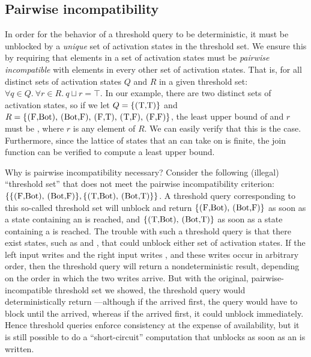 \subsection{Pairwise incompatibility}\label{subsec:pairwise-incompatibility}

In order for the behavior of a threshold query
to be deterministic, it must be unblocked by
a \emph{unique} set of activation states in the threshold set.  
We ensure this by
requiring that elements in a set of activation states must be
\emph{pairwise incompatible} with elements in every other set of
activation states.  That is, for all distinct sets of activation states $Q$
and $R$ in a given threshold set: $\forall q \in Q.~\forall r \in R.~q \sqcup r = \top$.
In our  example, there are two distinct sets of activation states, so if
we let $Q = \{ \textrm{\il{(T,T)}} \}$ and $R = \{
\textrm{\il{(F,Bot)}, \il{(Bot,F)}, \il{(F,T)}, \il{(T,F)},
  \il{(F,F)}} \}$, the least upper bound of  and $r$ must be
, where $r$ is any element of $R$.  We can easily verify that
this is the case.  Furthermore, since the lattice of states that an
 can take on is finite, the join function can be verified to compute a
least upper bound.

Why is pairwise incompatibility necessary?  Consider the following
(illegal) ``threshold set'' that does not meet the pairwise
incompatibility criterion:
$ \{ \{ \textrm{\il{(F,Bot)}, \il{(Bot,F)}} \},  \{ \textrm{\il{(T,Bot)}, \il{(Bot,T)}} \} \} $.
A threshold query corresponding to this so-called threshold set will
unblock and return $\{ \textrm{\il{(F,Bot)}, \il{(Bot,F)}} \}$
as soon as a state containing an
 is reached, and $\{ \textrm{\il{(T,Bot)}, \il{(Bot,T)}} \}$
as soon as a state
containing a  is reached.  The trouble with such a threshold
query is that there exist states, such as  and ,
that could unblock either set of activation states.  If the left input
writes  and the right input writes , and these writes
occur in arbitrary order, then the threshold query will return a
nondeterministic result, depending on the order in which the two
writes arrive.  But with the original, pairwise-incompatible threshold
set we showed, the threshold query would deterministically return
---although if the  arrived first, the query would
have to block until the  arrived, whereas if the  arrived
first, it could unblock immediately.  Hence threshold queries enforce
consistency at the expense of availability, but it is still possible
to do a ``short-circuit'' computation that unblocks as soon as an
 is written.

